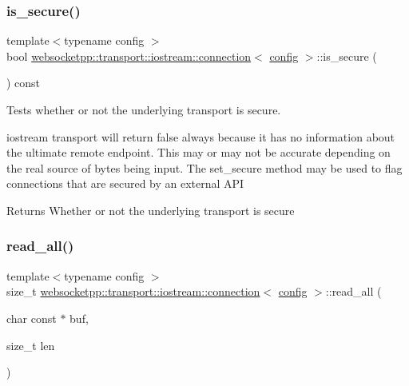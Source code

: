 \subsubsection{\texorpdfstring{is\+\_\+secure()}{is\_secure()}}
{\footnotesize\ttfamily template$<$typename config $>$ \\
bool \mbox{\hyperlink{classwebsocketpp_1_1transport_1_1iostream_1_1connection}{websocketpp\+::transport\+::iostream\+::connection}}$<$ \mbox{\hyperlink{classconfig}{config}} $>$\+::is\+\_\+secure (\begin{DoxyParamCaption}{ }\end{DoxyParamCaption}) const\hspace{0.3cm}{\ttfamily [inline]}}



Tests whether or not the underlying transport is secure. 

iostream transport will return false always because it has no information about the ultimate remote endpoint. This may or may not be accurate depending on the real source of bytes being input. The {\ttfamily set\+\_\+secure} method may be used to flag connections that are secured by an external A\+PI

\begin{DoxyReturn}{Returns}
Whether or not the underlying transport is secure 
\end{DoxyReturn}
\mbox{\label{classwebsocketpp_1_1transport_1_1iostream_1_1connection_a4a492425587bf02f557d8f03b8be8dc8}} 
\subsubsection{\texorpdfstring{read\+\_\+all()}{read\_all()}}
{\footnotesize\ttfamily template$<$typename config $>$ \\
size\+\_\+t \mbox{\hyperlink{classwebsocketpp_1_1transport_1_1iostream_1_1connection}{websocketpp\+::transport\+::iostream\+::connection}}$<$ \mbox{\hyperlink{classconfig}{config}} $>$\+::read\+\_\+all (\begin{DoxyParamCaption}\item[{char const $\ast$}]{buf,  }\item[{size\+\_\+t}]{len }\end{DoxyParamCaption})\hspace{0.3cm}{\ttfamily [inline]}}



